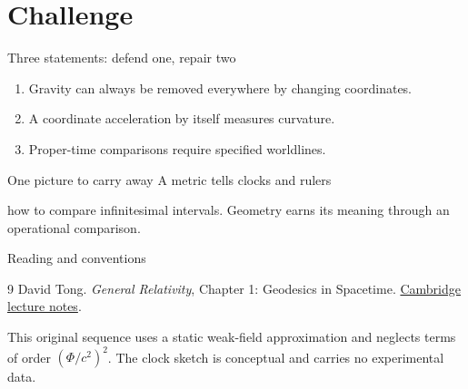 \documentclass[11pt,aspectratio=169]{beamer}
\begin{document}
\section{Challenge}
\begin{frame}{Three statements: defend one, repair two}
\begin{enumerate}
\item Gravity can always be removed everywhere by changing coordinates.
\item A coordinate acceleration by itself measures curvature.
\item Proper-time comparisons require specified worldlines.
\end{enumerate}
\bigskip
{}
\end{frame}
\begin{frame}[plain]{One picture to carry away}
\centering\Large
A metric tells clocks and rulers\par
how to compare infinitesimal intervals.
\bigskip
\normalsize Geometry earns its meaning through an operational comparison.
\end{frame}
\appendix
\begin{frame}{Reading and conventions}
\small
\begin{thebibliography}{9}
 David Tong. \emph{General Relativity}, Chapter 1: Geodesics in Spacetime.
\href{https://www.damtp.cam.ac.uk/user/tong/gr/grhtml/S1.html}{Cambridge lecture notes}.
\end{thebibliography}
This original sequence uses a static weak-field approximation and neglects terms of order $(\Phi/c^2)^2$. The clock sketch is conceptual and carries no experimental data.
\end{frame}
\end{document}

